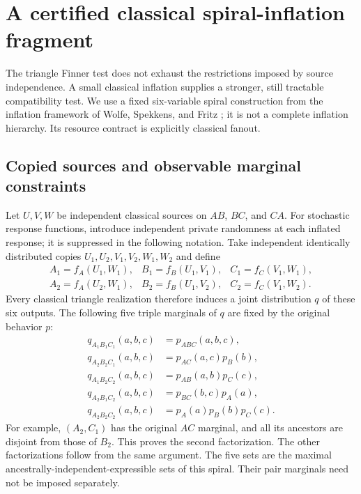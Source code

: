 \section{A certified classical spiral-inflation fragment}
\label{sec:spiralinflation}

The triangle Finner test does not exhaust the restrictions imposed by source
independence. A small classical inflation supplies a stronger, still tractable
compatibility test. We use a fixed six-variable spiral construction from the
inflation framework of Wolfe, Spekkens, and Fritz
\cite{wolfe2019classicalinflation}; it is not a complete inflation hierarchy.
Its resource contract is explicitly classical fanout.

\subsection{Copied sources and observable marginal constraints}
Let $U,V,W$ be independent classical sources on $AB$, $BC$, and $CA$.
For stochastic response functions, introduce independent private randomness
at each inflated response; it is suppressed in the following notation.
Take independent identically distributed copies $U_1,U_2,V_1,V_2,W_1,W_2$
and define
\[
\begin{array}{lll}
 A_1=f_A(U_1,W_1),&B_1=f_B(U_1,V_1),&C_1=f_C(V_1,W_1),\\
 A_2=f_A(U_2,W_1),&B_2=f_B(U_1,V_2),&C_2=f_C(V_1,W_2).
\end{array}
\]
Every classical triangle realization therefore induces a joint distribution
$q$ of these six outputs. The following five triple marginals of $q$ are
fixed by the original behavior $p$:
\begin{equation}
\begin{aligned}
 q_{A_1B_1C_1}(a,b,c)&=p_{ABC}(a,b,c),\\
 q_{A_2B_2C_1}(a,b,c)&=p_{AC}(a,c)p_B(b),\\
 q_{A_1B_2C_2}(a,b,c)&=p_{AB}(a,b)p_C(c),\\
 q_{A_2B_1C_2}(a,b,c)&=p_{BC}(b,c)p_A(a),\\
 q_{A_2B_2C_2}(a,b,c)&=p_A(a)p_B(b)p_C(c).
\end{aligned}
\label{eq:spiralmarginals}
\end{equation}
For example, $(A_2,C_1)$ has the original $AC$ marginal, and all its
ancestors are disjoint from those of $B_2$. This proves the second
factorization. The other factorizations follow from the same argument.
The five sets are the maximal ancestrally-independent-expressible sets of
this spiral. Their pair marginals need not be imposed separately.

